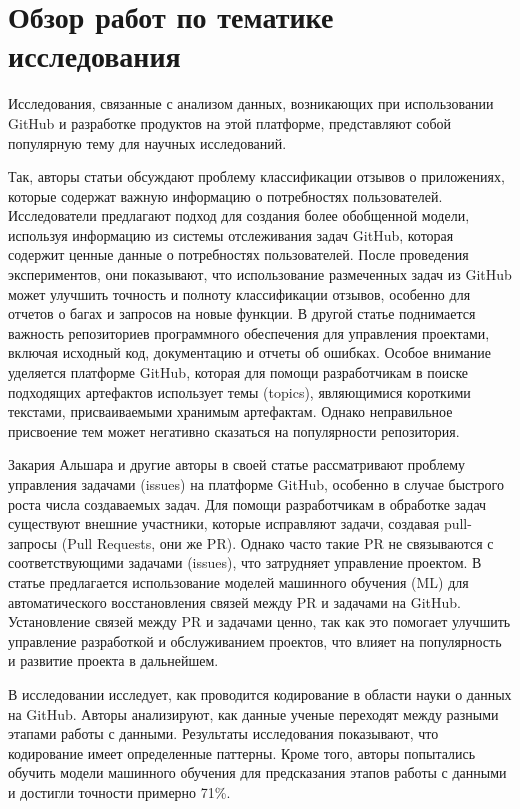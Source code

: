 \newpage
\section{Обзор работ по тематике исследования}
\label{sec:Background}

Исследования, связанные с анализом данных, возникающих при использовании GitHub и разработке продуктов на этой платформе, представляют собой популярную тему для научных исследований.

Так, авторы статьи \cite{abs-2308-14211} обсуждают проблему классификации отзывов о приложениях, которые содержат важную информацию о потребностях пользователей. Исследователи предлагают подход для создания более обобщенной модели, используя информацию из системы отслеживания задач GitHub, которая содержит ценные данные о потребностях пользователей. После проведения экспериментов, они показывают, что использование размеченных задач из GitHub может улучшить точность и полноту классификации отзывов, особенно для отчетов о багах и запросов на новые функции. В другой статье \cite{RoccoRSNR23} поднимается важность репозиториев программного обеспечения для управления проектами, включая исходный код, документацию и отчеты об ошибках. Особое внимание уделяется платформе GitHub, которая для помощи разработчикам в поиске подходящих артефактов использует темы (topics), являющимися короткими текстами, присваиваемыми хранимым артефактам. Однако неправильное присвоение тем может негативно сказаться на популярности репозитория. 

Закария Альшара и другие авторы в своей статье \cite{AlsharaSSS23} рассматривают проблему управления задачами (issues) на платформе GitHub, особенно в случае быстрого роста числа создаваемых задач. Для помощи разработчикам в обработке задач существуют внешние участники, которые исправляют задачи, создавая pull-запросы (Pull Requests, они же PR). Однако часто такие PR не связываются с соответствующими задачами (issues), что затрудняет управление проектом. В статье предлагается использование моделей машинного обучения (ML) для автоматического восстановления связей между PR и задачами на GitHub. Установление связей между PR и задачами ценно, так как это помогает улучшить управление разработкой и обслуживанием проектов, что влияет на популярность и развитие проекта в дальнейшем.

В исследовании \cite{RamasamySBB23} исследует, как проводится кодирование в области науки о данных на GitHub. Авторы анализируют, как данные ученые переходят между разными этапами работы с данными. Результаты исследования показывают, что кодирование имеет определенные паттерны. Кроме того, авторы попытались обучить модели машинного обучения для предсказания этапов работы с данными и достигли точности примерно 71\%.

